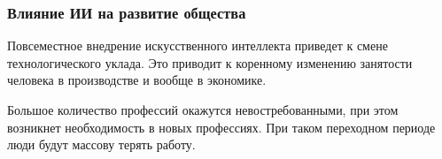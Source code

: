 
\subsubsection{Влияние ИИ на развитие общества}


Повсеместное внедрение искусственного интеллекта приведет к смене технологического уклада. Это приводит к коренному изменению занятости человека в производстве и вообще в экономике. 

Большое количество профессий окажутся невостребованными, при этом возникнет необходимость в новых профессиях. При таком переходном периоде люди будут массову терять работу.



